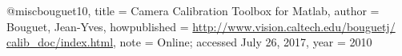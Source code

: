 @misc{bouguet10,
  title        = {{C}amera {C}alibration {T}oolbox for {M}atlab},
  author       = {Bouguet, Jean-Yves},
  howpublished = {\url{http://www.vision.caltech.edu/bouguetj/
                  calib\_doc/index.html}},
  note         = {Online; accessed July 26, 2017},
  year         = {2010}
}
